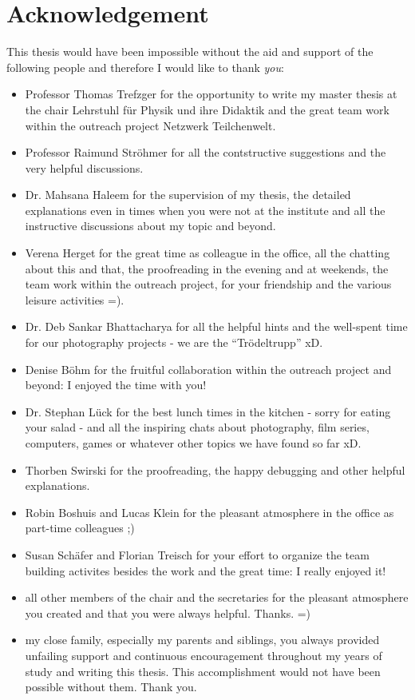 \chapter*{Acknowledgement}
This thesis would have been impossible without the aid and support of the following people and therefore I would like to thank \textit{you}:
\begin{itemize}
 \item Professor Thomas Trefzger for the opportunity to write my master thesis at the chair Lehrstuhl f\"{u}r Physik und ihre Didaktik and the great team work within the outreach project Netzwerk Teilchenwelt.
 \item Professor Raimund Str\"{o}hmer for all the contstructive suggestions and the very helpful discussions.
 \item Dr. Mahsana Haleem for the supervision of my thesis, the detailed explanations even in times when you were not at the institute and all the instructive discussions about my topic and beyond.
 \item Verena Herget for the great time as colleague in the office, all the chatting about this and that, the proofreading in the evening and at weekends, the team work within the outreach project, for your friendship and the various leisure activities =). 
 \item Dr. Deb Sankar Bhattacharya for all the helpful hints and the well-spent time for our photography projects - we are the ``Tr\"{o}deltrupp'' xD.
 \item Denise B\"{o}hm for the fruitful collaboration within the outreach project and beyond: I enjoyed the time with you!
 \item Dr. Stephan L\"{u}ck for the best lunch times in the kitchen - sorry for eating your salad - and all the inspiring chats about photography, film series, computers, games or whatever other topics we have found so far xD.
 \item Thorben Swirski for the proofreading, the happy debugging and other helpful explanations. 
 \item Robin Boshuis and Lucas Klein for the pleasant atmosphere in the office as part-time colleagues ;)
 \item Susan Sch\"{a}fer and Florian Treisch for your effort to organize the team building activites besides the work and the great time: I really enjoyed it!
 \item all other members of the chair and the secretaries for the pleasant atmosphere you created and that you were always helpful. Thanks. =) 
 \item my close family, especially my parents and siblings, you always provided unfailing support and continuous encouragement throughout my years of study and writing this thesis. This accomplishment would not have been possible without them. Thank you. 
\end{itemize}
